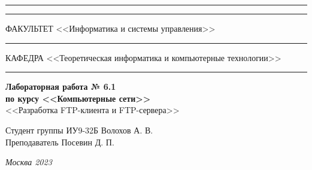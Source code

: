 \documentclass[a4paper, 14pt]{extarticle}
\begin{document}
\begin{titlepage}
\vspace{-25pt}
\hspace{-35pt}\rule{\textwidth}{2.3pt}

\vspace*{-20.3pt}
\hspace{-35pt}\rule{\textwidth}{0.4pt}

\vspace{1.5ex}
\hspace{-35pt} \noindent \small ФАКУЛЬТЕТ\hspace{80pt} <<Информатика и системы управления>>

\vspace*{-16pt}
\hspace{47pt}\rule{0.83\textwidth}{0.4pt}

\vspace{0.5ex}
\hspace{-35pt} \noindent \small КАФЕДРА\hspace{50pt} <<Теоретическая информатика и компьютерные технологии>>

\vspace*{-16pt}
\hspace{30pt}\rule{0.866\textwidth}{0.4pt}
  
\vspace{11em}

\begin{center}
\Large {\bf Лабораторная работа № 6.1} \\ 
\large {\bf по курсу <<Компьютерные сети>>} \\
\large <<Разработка FTP-клиента и FTP-сервера>> 
\end{center}\normalsize

\vspace{8em}


\begin{flushright}
  {Студент группы ИУ9-32Б Волохов А. В. \hspace*{15pt}\\ 
  \vspace{2ex}
  Преподаватель Посевин Д. П.\hspace*{15pt}}
\end{flushright}

\bigskip

\vfill
 

\begin{center}
\textsl{Москва 2023}
\end{center}
\end{titlepage}
\end{document}
